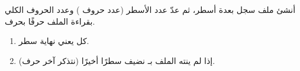 \begin{statement}
أنشئ ملف سجل  بعدة أسطر، ثم عدّ عدد الأسطر (عدد حروف ) وعدد الحروف الكلي بقراءة الملف حرفًا بحرف.
\end{statement}
\begin{stepsbox}\begin{enumerate}
\item كل  يعني نهاية سطر.
\item إذا لم ينته الملف بـ  نضيف سطرًا أخيرًا (نتذكر آخر حرف).
\end{enumerate}\end{stepsbox}
